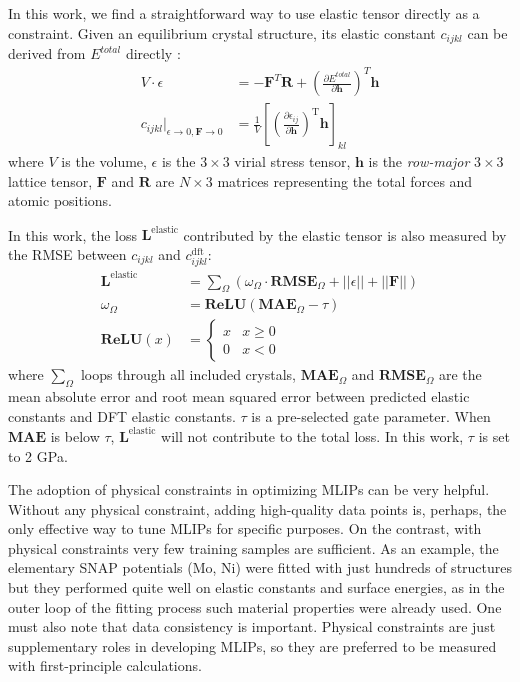 \documentclass[final,3p,times]{elsarticle}
\begin{document}
In this work, we find a straightforward way to use elastic tensor directly as a 
constraint. Given an equilibrium crystal structure, its elastic constant 
$c_{ijkl}$ can be derived from $E^{total}$ directly \cite{Elastic}:
\begin{align}
\label{eq:virial}
V \cdot \epsilon & = -\mathbf{F}^{T}\mathbf{R} + \left(
    \frac{\partial E^{total}}{\partial \mathbf{h}}\right)^T \mathbf{h} \\ 
\label{eq:cijkl}
c_{ijkl} |_{\epsilon \to 0, \mathbf{F} \to 0} & = \frac{1}{V}\left[
    \left( 
        \frac{\partial{\epsilon_{ij}}}{\partial{\mathbf{h}}}
    \right)^{\mathrm{T}}\mathbf{h}
\right]_{kl}
\end{align}
where $V$ is the volume, $\epsilon$ is the $3 \times 3$ virial stress tensor, 
$\mathbf{h}$ is the \textit{row-major} $3 \times 3$ lattice tensor, $\mathbf{F}$ 
and $\mathbf{R}$ are $N \times 3$ matrices representing the total forces and 
atomic positions.

In this work, the loss $\mathbf{L}^{\mathrm{elastic}}$ contributed by the 
elastic tensor is also measured by the RMSE between $c_{ijkl}$ and 
$c_{ijkl}^{\mathrm{dft}}$:
\begin{align}
\label{eq:cijkl_loss}
\mathbf{L}^{\mathrm{elastic}} 
& = \sum_{\Omega}{\left(
    \omega_{\Omega} \cdot \mathbf{RMSE}_{\Omega} 
    + ||\epsilon|| + ||\mathbf{F}||
\right)}
 \\
\label{eq:cijkl_loss_gate}
\omega_{\Omega} & = \mathbf{ReLU}(\mathbf{MAE}_{\Omega} - \tau) \\
\label{eq:relu}
\mathbf{ReLU}(x) & = \begin{cases}
    x & x \ge 0 \\
    0 & x < 0
\end{cases}
\end{align}
where $\sum_{\Omega}$ loops through all included crystals, 
$\mathbf{MAE}_{\Omega}$ and $\mathbf{RMSE}_{\Omega}$ are the mean absolute error 
and root mean squared error between predicted elastic constants and DFT elastic 
constants. $\tau$ is a pre-selected gate parameter. 
When $\mathbf{MAE}$ is below $\tau$, $\mathbf{L}^{\mathrm{elastic}}$ will not 
contribute to the total loss. In this work, $\tau$ is set to 2 GPa.

The adoption of physical constraints in optimizing MLIPs can be very helpful. 
Without any physical constraint, adding high-quality data points is, perhaps, 
the only effective way to tune MLIPs for specific purposes. On the contrast, 
with physical constraints very few training samples are sufficient.
As an example, the elementary SNAP potentials (Mo, Ni) were fitted with just 
hundreds of structures but they performed quite well on elastic constants and 
surface energies, as in the outer loop \cite{SNAP_Mo} of the fitting process 
such material properties were already used. One must also note that data 
consistency is important. Physical constraints are just supplementary roles in 
developing MLIPs, so they are preferred to be measured with first-principle 
calculations.
\end{document}
